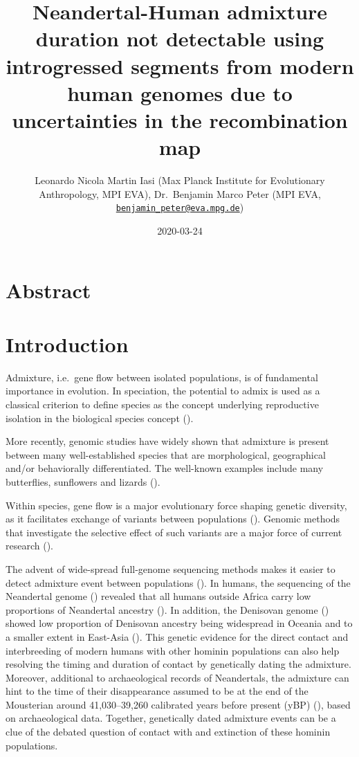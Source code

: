 \documentclass[]{article}
\title{Neandertal-Human admixture duration not detectable using introgressed
segments from modern human genomes due to uncertainties in the
recombination map}
\author{Leonardo Nicola Martin Iasi (Max Planck Institute for Evolutionary
Anthropology, MPI EVA), Dr.~Benjamin Marco Peter (MPI EVA,
\href{mailto:benjamin_peter@eva.mpg.de}{\nolinkurl{benjamin\_peter@eva.mpg.de}})}
\date{2020-03-24}
\begin{document}
\maketitle

\section{Abstract}\label{abstract}

\section{Introduction}\label{introduction}

Admixture, i.e.~gene flow between isolated populations,
 is of fundamental importance in evolution. In 
speciation, the  
potential to admix is used as a classical criterion to define  species as the concept underlying  reproductive
isolation in the biological species concept (\cite{mayr_animal_1963}).

More recently, genomic studies have widely shown that admixture is present between many well-established species that are morphological, geographical and/or behaviorally differentiated. The well-known examples include many butterflies, sunflowers and lizards (\cite{Salazar_Hybrid_speciation_2010, rieseberg_hybridization_2007,kronforst_multilocus_2006,kolbe_multiple_2007}). 

Within species, gene flow is a major evolutionary force  shaping genetic diversity, as it facilitates exchange of variants between populations
(\cite{harrison_hybridization_2014}). Genomic methods that investigate the selective effect of such variants  are a major force of current research (\cite{hedrick_adaptive_2013,
shaw_genes_2011,payseur_using_2010}).

The advent of wide-spread full-genome sequencing methods makes it easier to detect admixture event
between populations (\cite{sousa_understanding_2013}). In humans, the sequencing of
the Neandertal genome (\cite{green_draft_2010}) revealed that all humans outside Africa carry low proportions of Neandertal ancestry
(\cite{green_draft_2010,prufer_complete_2013,vernot_resurrecting_2014,fu_early_2015,fu_genome_2014,sankararaman_genomic_2014,prufer_high-coverage_2017}). In addition, the  Denisovan genome (\cite{reich_genetic_2010})
showed low proportion of Denisovan ancestry being widespread in Oceania and to a smaller extent in East-Asia
(\cite{reich_genetic_2010,meyer_high-coverage_2012,sankararaman_combined_2016,vernot_excavating_2016,malaspinas_genomic_2016}).
This genetic evidence for the direct contact and interbreeding of modern humans with other hominin populations can also help resolving the timing and duration of contact by genetically dating the admixture.
Moreover, additional to archaeological records of Neandertals, the admixture can hint to the time of their disappearance assumed to be at the end of the Mousterian around 41,030–39,260 calibrated years before present (yBP) (\cite{higham_timing_2014}), based on archaeological data. 
Together, genetically dated admixture events can be a clue of the debated question of contact with and extinction of these hominin populations.
\end{document}
